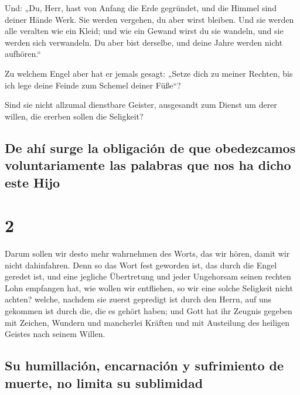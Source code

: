  Und: „Du, Herr, hast von Anfang die Erde gegründet, und
die Himmel sind deiner Hände Werk.  Sie werden vergehen,
du aber wirst bleiben. Und sie werden alle veralten wie ein Kleid;
 und wie ein Gewand wirst du sie wandeln, und sie werden
sich verwandeln. Du aber bist derselbe, und deine Jahre werden nicht
aufhören.``

 Zu welchem Engel aber hat er jemals gesagt: „Setze dich
zu meiner Rechten, bis ich lege deine Feinde zum Schemel deiner Füße``?

 Sind sie nicht allzumal dienstbare Geister, ausgesandt
zum Dienst um derer willen, die ererben sollen die Seligkeit?

\hypertarget{de-ahuxed-surge-la-obligaciuxf3n-de-que-obedezcamos-voluntariamente-las-palabras-que-nos-ha-dicho-este-hijo}{%
\subsection{De ahí surge la obligación de que obedezcamos
voluntariamente las palabras que nos ha dicho este
Hijo}\label{de-ahuxed-surge-la-obligaciuxf3n-de-que-obedezcamos-voluntariamente-las-palabras-que-nos-ha-dicho-este-hijo}}

\hypertarget{section-1}{%
\section{2}\label{section-1}}

 Darum sollen wir desto mehr wahrnehmen des Worts, das wir
hören, damit wir nicht dahinfahren.  Denn so das Wort fest
geworden ist, das durch die Engel geredet ist, und eine jegliche
Übertretung und jeder Ungehorsam seinen rechten Lohn empfangen hat,
 wie wollen wir entfliehen, so wir eine solche Seligkeit
nicht achten? welche, nachdem sie zuerst gepredigt ist durch den Herrn,
auf uns gekommen ist durch die, die es gehört haben;  und
Gott hat ihr Zeugnis gegeben mit Zeichen, Wundern und mancherlei Kräften
und mit Austeilung des heiligen Geistes nach seinem Willen.

\hypertarget{su-humillaciuxf3n-encarnaciuxf3n-y-sufrimiento-de-muerte-no-limita-su-sublimidad}{%
\subsection{Su humillación, encarnación y sufrimiento de muerte, no
limita su
sublimidad}\label{su-humillaciuxf3n-encarnaciuxf3n-y-sufrimiento-de-muerte-no-limita-su-sublimidad}}

